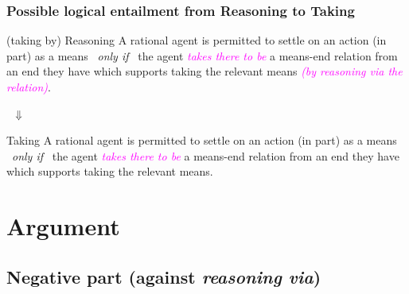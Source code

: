 \documentclass[noamssymb,
graphics,
]{beamer} %
\newcommand{\schemaName}[1]{\textsf{#1}}
\begin{document}
\begin{frame}
  \frametitle{Possible logical entailment from \schemaName{Reasoning} to \schemaName{Taking}}

  \begin{block}{(taking by) Reasoning}
   A rational agent is permitted to settle on an action (in part) as a means
    \newline
    \mbox{ }\hfill\emph{only if}\hfill\mbox{ }
    \newline
    the agent \textcolor{fuchsia}{\emph{takes there to be}}  a means-end relation from an end they have which supports taking the relevant means \textcolor{fuchsia}{\emph{(by reasoning via the relation)}}.
  \end{block}

  {\Large \mbox{ }\hfill\(\Downarrow\)\hfill\mbox{ }}

  \begin{block}{Taking}
    A rational agent is permitted to settle on an action (in part) as a means
    \newline
    \mbox{ }\hfill\emph{only if}\hfill\mbox{ }
    \newline
    the agent \textcolor{fuchsia}{\emph{takes there to be}} a means-end relation from an end they have which supports taking the relevant means.
  \end{block}

\end{frame}


\section{Argument}
\label{sec:argument}


\subsection{Negative part (against \emph{reasoning via})}%
\label{sec:negative}
\end{document}
